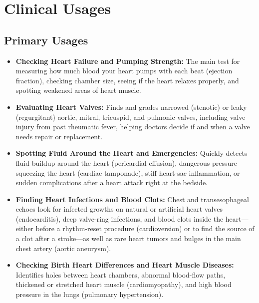 \section{Clinical Usages}

\subsection{Primary Usages}
\begin{itemize}
\item \textbf{Checking Heart Failure and Pumping Strength:} The main test for measuring how much blood your heart pumps with each beat (ejection fraction), checking chamber size, seeing if the heart relaxes properly, and spotting weakened areas of heart muscle.
\item \textbf{Evaluating Heart Valves:} Finds and grades narrowed (stenotic) or leaky (regurgitant) aortic, mitral, tricuspid, and pulmonic valves, including valve injury from past rheumatic fever, helping doctors decide if and when a valve needs repair or replacement.
\item \textbf{Spotting Fluid Around the Heart and Emergencies:} Quickly detects fluid buildup around the heart (pericardial effusion), dangerous pressure squeezing the heart (cardiac tamponade), stiff heart-sac inflammation, or sudden complications after a heart attack right at the bedside.
\item \textbf{Finding Heart Infections and Blood Clots:} Chest and transesophageal echoes look for infected growths on natural or artificial heart valves (endocarditis), deep valve-ring infections, and blood clots inside the heart---either before a rhythm-reset procedure (cardioversion) or to find the source of a clot after a stroke---as well as rare heart tumors and bulges in the main chest artery (aortic aneurysm).
\item \textbf{Checking Birth Heart Differences and Heart Muscle Diseases:} Identifies holes between heart chambers, abnormal blood-flow paths, thickened or stretched heart muscle (cardiomyopathy), and high blood pressure in the lungs (pulmonary hypertension).
\end{itemize}

